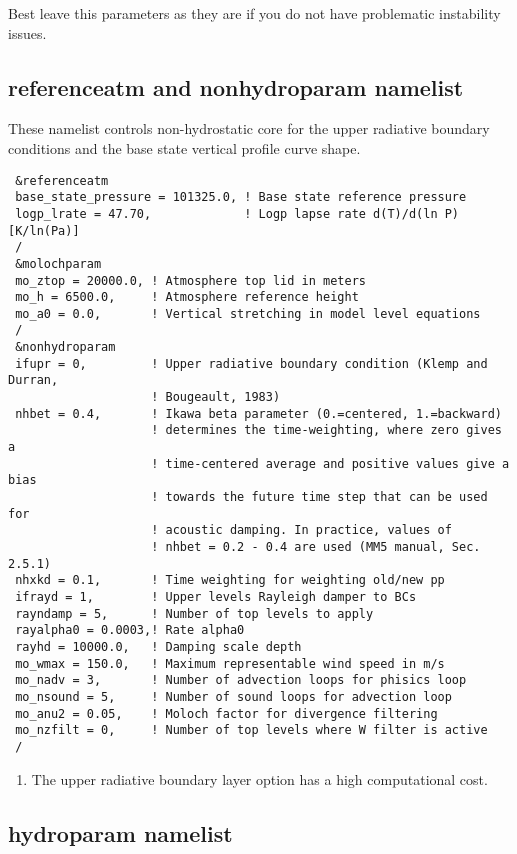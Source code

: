 Best leave this parameters as they are if you do not have problematic
instability issues.

\subsection{referenceatm and nonhydroparam namelist}

These namelist controls non-hydrostatic core for the upper radiative boundary
conditions and the base state vertical profile curve shape.

{\footnotesize
\begin{Verbatim}
 &referenceatm
 base_state_pressure = 101325.0, ! Base state reference pressure
 logp_lrate = 47.70,             ! Logp lapse rate d(T)/d(ln P) [K/ln(Pa)]
 /
 &molochparam
 mo_ztop = 20000.0, ! Atmosphere top lid in meters
 mo_h = 6500.0,     ! Atmosphere reference height
 mo_a0 = 0.0,       ! Vertical stretching in model level equations
 /
 &nonhydroparam
 ifupr = 0,         ! Upper radiative boundary condition (Klemp and Durran,
                    ! Bougeault, 1983)
 nhbet = 0.4,       ! Ikawa beta parameter (0.=centered, 1.=backward)
                    ! determines the time-weighting, where zero gives a
                    ! time-centered average and positive values give a bias
                    ! towards the future time step that can be used for
                    ! acoustic damping. In practice, values of
                    ! nhbet = 0.2 - 0.4 are used (MM5 manual, Sec. 2.5.1)
 nhxkd = 0.1,       ! Time weighting for weighting old/new pp
 ifrayd = 1,        ! Upper levels Rayleigh damper to BCs
 rayndamp = 5,      ! Number of top levels to apply
 rayalpha0 = 0.0003,! Rate alpha0
 rayhd = 10000.0,   ! Damping scale depth
 mo_wmax = 150.0,   ! Maximum representable wind speed in m/s
 mo_nadv = 3,       ! Number of advection loops for phisics loop
 mo_nsound = 5,     ! Number of sound loops for advection loop
 mo_anu2 = 0.05,    ! Moloch factor for divergence filtering
 mo_nzfilt = 0,     ! Number of top levels where W filter is active
 /
\end{Verbatim}
}

\begin{enumerate}
\item The upper radiative boundary layer option has a high computational cost.
\end{enumerate}

\subsection{hydroparam namelist}

